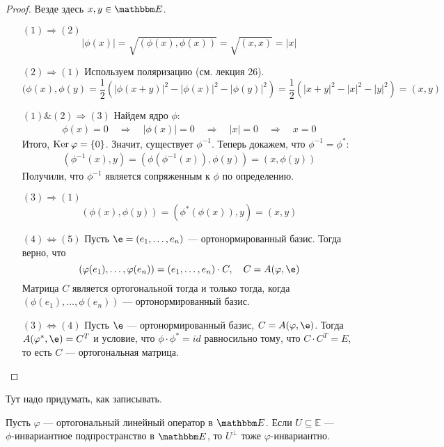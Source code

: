 \begin{proof}
Везде здесь $x, y \in \E$.
\begin{itemize}[align=left]
\item[$(1) \Rightarrow (2)$]
$$
|\phi(x)| = \sqrt{(\phi(x), \phi(x))} = \sqrt{(x, x)} = |x|
$$
\item[$(2) \Rightarrow (1)$] Используем поляризацию (см. лекция 26).
$$
(\phi(x), \phi(y) = \frac{1}{2}(|\phi(x + y)|^2 - |\phi(x)|^2 - |\phi(y)|^2) = \frac{1}{2}(|x + y|^2 - |x|^2 - |y|^2) = (x, y)
$$ 
\item[$(1)\&(2) \Rightarrow (3)$] Найдем ядро $\phi$:
\begin{gather*}
\phi(x) = 0 \quad \Rightarrow \quad |\phi(x)| = 0 \quad \Rightarrow \quad |x| = 0 \quad \Rightarrow \quad x = 0
\end{gather*}
Итого, $\mathrm{Ker}\: \varphi = \{0\}$. Значит, существует $\phi^{-1}$. Теперь докажем, что $\phi^{-1} = \phi^*$:
\begin{gather*}
(\phi^{-1}(x), y) = (\phi(\phi^{-1}(x)), \phi(y)) = (x, \phi(y))
\end{gather*}
Получили, что $\phi^{-1}$ является сопряженным к $\phi$ по определению.
\item[$(3) \Rightarrow (1)$] 
$$
(\phi(x), \phi(y)) = (\phi^*(\phi(x)), y) = (x, y)
$$
\item[$(4) \Leftrightarrow (5)$] Пусть $\e = (e_1, \ldots, e_n)$ --- ортонормированный базис. Тогда верно, что
$$
(\phi(e_1), \ldots, \phi(e_n)) = (e_1, \ldots, e_n) \cdot C, \quad C = A(\phi, \e)
$$
Матрица $C$ является ортогональной тогда и только тогда, когда $(\phi(e_1), \ldots, \phi(e_n))$ --- ортонормированный базис.
\item[$(3) \Leftrightarrow (4)$] Пусть $\e$ --- ортонормированный базис, $C = A(\phi, \e)$. Тогда $A(\phi^*, \e) = C^T$ и условие, что $\phi\cdot\phi^* = id$ равносильно тому, что $C\cdot C^T = E$, то есть $C$ --- ортогональная матрица.
\end{itemize}
\end{proof}

\begin{Examples}
Тут надо придумать, как записывать.
\end{Examples}

\begin{Suggestion}
	Пусть $\varphi$ --- ортогональный линейный оператор в $\E$. Если $U \subseteq \mathbb{E}$ ---\\ $\phi$-инвариантное подпространство в $\E$, то $U^\perp$ тоже $\varphi$-инвариантно.
\end{Suggestion}

